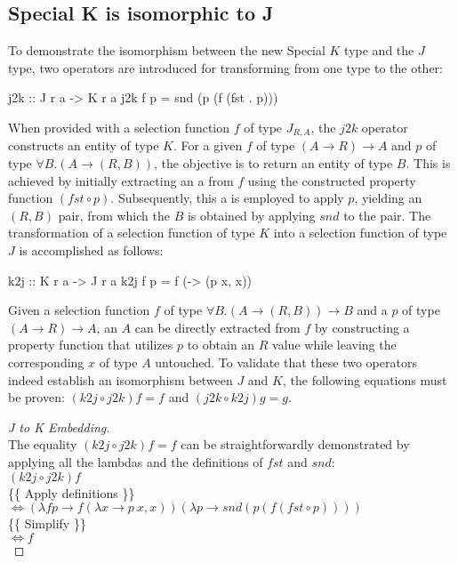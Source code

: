 \documentclass[runningheads]{llncs}
\begin{document}
\subsection{Special K is isomorphic to
J}\label{special-k-is-isomorphic-to-j}

To demonstrate the isomorphism between the new Special \(K\) type and
the \(J\) type, two operators are introduced for transforming from one
type to the other:

\begin{code}
j2k :: J r a -> K r a
j2k f p = snd (p (f (fst . p)))
\end{code}

When provided with a selection function \(f\) of type \(J_{R,A}\), the
\(j2k\) operator constructs an entity of type \(K\). For a given \(f\)
of type \((A \rightarrow R) \rightarrow A\) and \(p\) of type
\(\forall B. (A \rightarrow (R,B))\), the objective is to return an
entity of type \(B\). This is achieved by initially extracting an a from
\(f\) using the constructed property function \((fst \circ p)\).
Subsequently, this a is employed to apply \(p\), yielding an \((R,B)\)
pair, from which the \(B\) is obtained by applying \(snd\) to the pair.
The transformation of a selection function of type \(K\) into a
selection function of type \(J\) is accomplished as follows:

\begin{code}
k2j :: K r a -> J r a
k2j f p = f (\x -> (p x, x)) 
\end{code}

Given a selection function \(f\) of type
\(\forall B. (A \rightarrow (R,B)) \rightarrow B\) and a \(p\) of type
\((A \rightarrow R) \rightarrow A\), an \(A\) can be directly extracted
from \(f\) by constructing a property function that utilizes \(p\) to
obtain an \(R\) value while leaving the corresponding \(x\) of type
\(A\) untouched. To validate that these two operators indeed establish
an isomorphism between \(J\) and \(K\), the following equations must be
proven: \((k2j \circ j2k) f = f\) and \((j2k \circ k2j) g = g\).

\begin{proof}[J to K Embedding]\\
The equality $(k2j \circ j2k) f = f$ can be straightforwardly demonstrated by applying all the 
lambdas and the definitions of $fst$ and $snd$:\\
$(k2j \circ j2k) f$\\
\{\{ Apply definitions \}\}\\
$\iff (\lambda f p \rightarrow f (\lambda x \rightarrow p\:x, x)) (\lambda p \rightarrow snd (p (f (fst \circ p))))$\\
\{\{ Simplify \}\}\\
$\iff f$\\
\end{proof}
\end{document}

